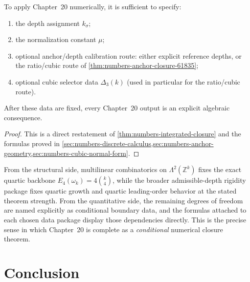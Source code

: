 \begin{corollary}
\label{cor:numbers-operational-checklist}
To apply Chapter~20 numerically, it is sufficient to
specify:
\begin{enumerate}[label=\textup{(\roman*)}]
\item
      the depth assignment \(k_\sigma\);
\item
      the normalization constant \(\mu\);
\item
      optional anchor/depth calibration route: either explicit reference
      depths, or the ratio/cubic route of
      \cref{thm:numbers-anchor-closure-61835};
\item
      optional cubic selector data \(\Delta_3(k)\)
      (used in particular for the ratio/cubic route).
\end{enumerate}
After these data are fixed, every Chapter~20 output is an explicit algebraic
consequence.
\end{corollary}

\begin{proof}
This is a direct restatement of
\cref{thm:numbers-integrated-closure} and the formulas proved in
\cref{sec:numbers-discrete-calculus,sec:numbers-anchor-geometry,sec:numbers-cubic-normal-form}.
\end{proof}

\begin{remark}
\label{rem:numbers-conditionally-complete}
From the structural side, multilinear combinatorics on
\(\Lambda^2(\mathbb Z^k)\) fixes the exact quartic backbone
\(E_4(\omega_k)=4\binom{k}{4}\), while the broader admissible-depth
rigidity package fixes quartic growth and quartic leading-order
behavior at the stated theorem strength.
From the quantitative side, the remaining degrees of freedom are
named explicitly as conditional boundary data, and the formulas
attached to each chosen data package display those dependencies
directly.
This is the precise sense in which Chapter~20 is complete as a
\emph{conditional} numerical closure theorem.
\end{remark}

\section{Conclusion}
\label{sec:numbers-conclusion}

